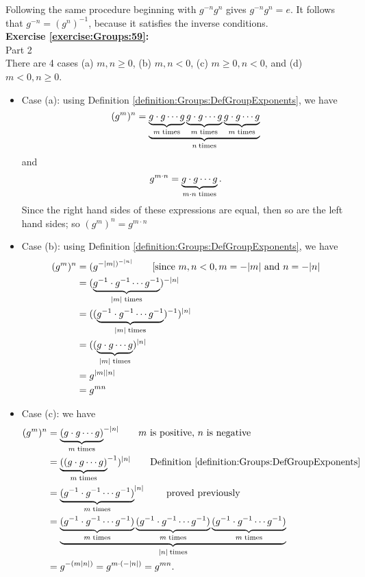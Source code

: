 \noindent Following the same procedure beginning with $g^{-n} g^n$ gives $g^{-n} g^n = e$.
It follows that $g^{-n} = (g^n)^{-1}$, because it satisfies the inverse conditions.
\\

\noindent\textbf{Exercise \ref{exercise:Groups:59}:}
\\
Part 2\\
There are 4 cases (a) $m, n \geq 0$, (b) $m, n < 0$, (c) $m \geq 0, n < 0$, and (d) $m < 0, n \geq 0$.\\
\begin{itemize}
\item
Case (a): using Definition \ref{definition:Groups:DefGroupExponents}, we have\\
\[
(g^m)^n = \underbrace{ \underbrace{g \cdot g \cdots g}_{m \; {\rm times}}\underbrace{g \cdot g \cdots g}_{m \; {\rm times}}\underbrace{g \cdot g \cdots g}_{m \; {\rm times}}}_{n \: {\rm times}}
\]
and
\[
g^{m \cdot n} = \underbrace{g \cdot g \cdots g}_{m \cdot n \; {\rm times}}.
\]
Since the right hand sides of these expressions are equal, then so are the left hand sides; so $(g^m)^n = g^{m \cdot n}$\\

\item
Case (b): using Definition  \ref{definition:Groups:DefGroupExponents}, we have\\
\begin{align*}
(g^m)^n &= (g^{-{|m|})^{-|n|}}  \qquad \text{[since }m,n < 0, m=-|m| \text{ and } n=-|n|\\
&= ( \underbrace{g^{-1} \cdot g^{-1} \cdots g^{-1}}_{|m| \; {\rm times}})^{-|n|}\\
&= (( \underbrace{g^{-1} \cdot g^{-1} \cdots g^{-1}}_{|m| \; {\rm times}})^{-1})^{|n|}\\
&= (( \underbrace{g \cdot g \cdots g}_{|m| \; {\rm times}})^{|n|}\\
& = g^{|m||n|}\\
&=g^{mn}
\end{align*}

\item
Case (c): we have\\
\begin{align*}
(g^m)^n &= {\underbrace{(g \cdot g \cdots g)}_{m \; {\rm times}}}^{-|n|}  \quad \quad m \text{ is positive, } n \text{ is negative}\\
&= {\underbrace{((g \cdot g \cdots g)}_{m \; {\rm times}}}^{-1})^{|n|}  \quad \quad \text{Definition  \ref{definition:Groups:DefGroupExponents}}\\
& = {\underbrace{(g^{-1} \cdot g^{-1}  \cdots g^{-1})}_{m \; {\rm times}}}^{|n|}  \quad \quad \text{ proved previously}\\
&= \underbrace{ \underbrace{(g^{-1} \cdot g^{-1} \cdots g^{-1})}_{m \; {\rm times}}\underbrace{(g^{-1} \cdot g^{-1} \cdots g^{-1})}_{m \; {\rm times}}\underbrace{(g^{-1} \cdot g^{-1} \cdots g^{-1})}_{m \; {\rm times}}}_{|n| \: {\rm times}}\\
 &= g^{-(m  |n|)} = g^{m \cdot (-|n|)} = g^{mn}.
\end{align*}


\end{itemize}
